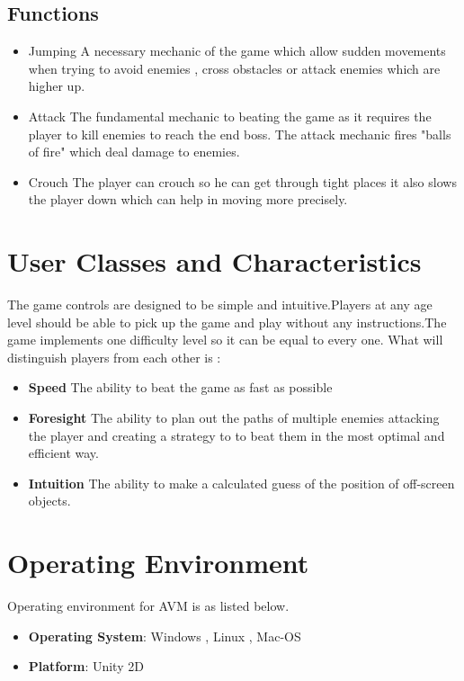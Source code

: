 \subsection{Functions}
\begin{itemize}
    \item Jumping
    A necessary mechanic of the game which allow sudden movements when trying to avoid enemies , cross obstacles or attack enemies which are higher up.
    \item Attack
    The fundamental mechanic to beating the game as it requires the player to kill enemies to reach the end boss. The attack mechanic fires "balls of fire" which deal damage to enemies.
    \item Crouch
    The player can crouch so he can get through tight places it also slows the player down which can help in moving more precisely.
\end{itemize}
\section{User Classes and Characteristics}
The game controls are designed to be simple and intuitive.Players at any age level should be able to pick up the game and play without any instructions.The game implements one difficulty level so it can be equal to every one. 
What will distinguish players from each other is : 
\begin{itemize}
    \item \textbf{Speed} The ability to beat the game as fast as possible
    \item \textbf{Foresight} The ability to plan out the paths of multiple enemies attacking the player and creating a strategy to to beat them in the most optimal and efficient way.
    \item \textbf{Intuition} The ability to make a calculated guess of the position of off-screen objects.
    
\end{itemize}
\section{Operating Environment}
Operating environment for AVM  is as listed below.
\begin{itemize}
    \item \textbf{Operating System}: Windows , Linux , Mac-OS
    \item \textbf{Platform}: Unity 2D
\end{itemize}

